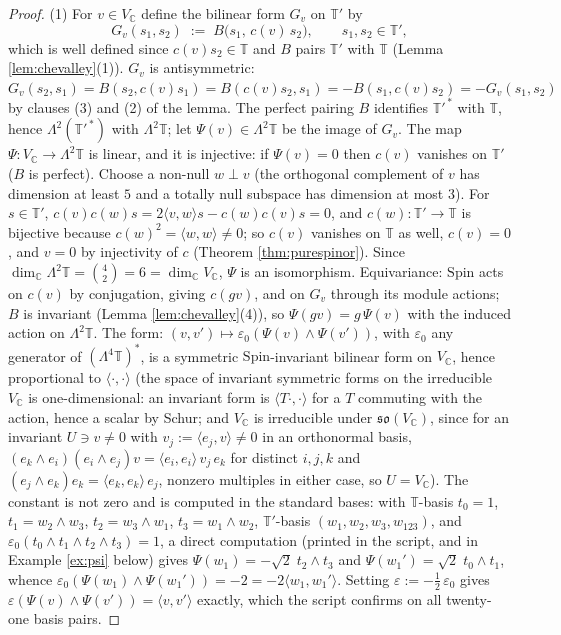 \documentclass[11pt]{article}
\theoremstyle{definition}
\newcommand{\C}{\mathbb{C}}
\newcommand{\T}{\mathbb{T}}
\newcommand{\ip}[2]{\langle #1, #2\rangle}
\begin{document}
\begin{proof}
(1) For $v \in V_\C$ define the bilinear form $G_v$ on $\T'$ by
\[
G_v(s_1, s_2) \;:=\; B\bigl(s_1,\, c(v)\,s_2\bigr), \qquad s_1, s_2 \in \T',
\]
which is well defined since $c(v)s_2 \in \T$ and $B$ pairs $\T'$ with $\T$ (Lemma \ref{lem:chevalley}(1)). $G_v$ is antisymmetric: $G_v(s_2, s_1) = B(s_2, c(v)s_1) = B(c(v)s_2, s_1) = -B(s_1, c(v)s_2) = -G_v(s_1,s_2)$ by clauses (3) and (2) of the lemma. The perfect pairing $B$ identifies $\T'^{\,*}$ with $\T$, hence $\Lambda^2(\T'^{\,*})$ with $\Lambda^2\T$; let $\Psi(v) \in \Lambda^2\T$ be the image of $G_v$. The map $\Psi: V_\C \to \Lambda^2\T$ is linear, and it is injective: if $\Psi(v) = 0$ then $c(v)$ vanishes on $\T'$ ($B$ is perfect). Choose a non-null $w \perp v$ (the orthogonal complement of $v$ has dimension at least $5$ and a totally null subspace has dimension at most $3$). For $s \in \T'$, $c(v)c(w)s = 2\ip{v}{w}s - c(w)c(v)s = 0$, and $c(w): \T' \to \T$ is bijective because $c(w)^2 = \ip{w}{w} \neq 0$; so $c(v)$ vanishes on $\T$ as well, $c(v) = 0$, and $v = 0$ by injectivity of $c$ (Theorem \ref{thm:purespinor}). Since $\dim_\C \Lambda^2\T = \binom42 = 6 = \dim_\C V_\C$, $\Psi$ is an isomorphism. Equivariance: $\mathrm{Spin}$ acts on $c(v)$ by conjugation, giving $c(gv)$, and on $G_v$ through its module actions; $B$ is invariant (Lemma \ref{lem:chevalley}(4)), so $\Psi(gv) = g\,\Psi(v)$ with the induced action on $\Lambda^2\T$. The form: $(v, v') \mapsto \varepsilon_0(\Psi(v)\wedge\Psi(v'))$, with $\varepsilon_0$ any generator of $(\Lambda^4\T)^*$, is a symmetric $\mathrm{Spin}$-invariant bilinear form on $V_\C$, hence proportional to $\ip{\cdot}{\cdot}$ (the space of invariant symmetric forms on the irreducible $V_\C$ is one-dimensional: an invariant form is $\ip{T\cdot}{\cdot}$ for a $T$ commuting with the action, hence a scalar by Schur; and $V_\C$ is irreducible under $\mathfrak{so}(V_\C)$, since for an invariant $U \ni v \neq 0$ with $v_j := \ip{e_j}{v} \neq 0$ in an orthonormal basis, $(e_k\wedge e_i)(e_i\wedge e_j)v = \ip{e_i}{e_i}\,v_j\,e_k$ for distinct $i, j, k$ and $(e_j\wedge e_k)e_k = \ip{e_k}{e_k}\,e_j$, nonzero multiples in either case, so $U = V_\C$). The constant is not zero and is computed in the standard bases: with $\T$-basis $t_0 = 1$, $t_1 = w_2\wedge w_3$, $t_2 = w_3 \wedge w_1$, $t_3 = w_1\wedge w_2$, $\T'$-basis $(w_1, w_2, w_3, w_{123})$, and $\varepsilon_0(t_0\wedge t_1\wedge t_2\wedge t_3) = 1$, a direct computation (printed in the script, and in Example \ref{ex:psi} below) gives $\Psi(w_1) = -\sqrt2\; t_2\wedge t_3$ and $\Psi(w_1') = \sqrt2\; t_0 \wedge t_1$, whence $\varepsilon_0(\Psi(w_1)\wedge\Psi(w_1')) = -2 = -2\ip{w_1}{w_1'}$. Setting $\varepsilon := -\tfrac12\,\varepsilon_0$ gives $\varepsilon(\Psi(v)\wedge\Psi(v')) = \ip{v}{v'}$ exactly, which the script confirms on all twenty-one basis pairs.

\end{proof}
\end{document}
